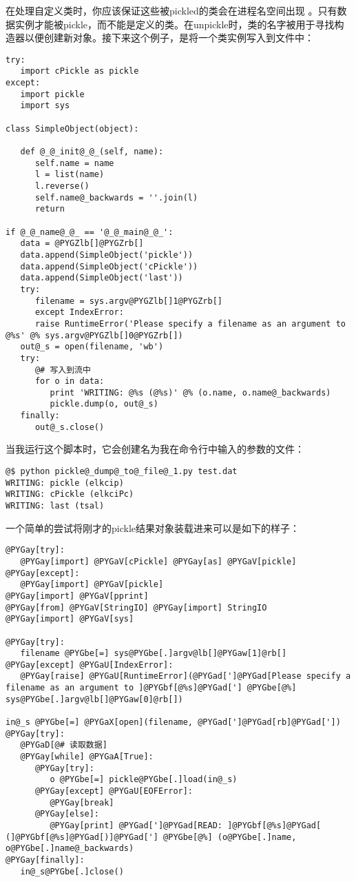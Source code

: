 \documentclass[a4paper,10pt,english]{manual}
\begin{document}
在处理自定义类时，你应该保证这些被pickled的类会在进程名空间出现 。只有数据实例才能被pickle，而不能是定义的类。在unpickle时，类的名字被用于寻找构造器以便创建新对象。接下来这个例子，是将一个类实例写入到文件中：

\begin{Verbatim}[commandchars=@\[\]]
try:
   import cPickle as pickle
except:
   import pickle
   import sys

class SimpleObject(object):

   def @_@_init@_@_(self, name):
      self.name = name
      l = list(name)
      l.reverse()
      self.name@_backwards = ''.join(l)
      return

if @_@_name@_@_ == '@_@_main@_@_':
   data = @PYGZlb[]@PYGZrb[]
   data.append(SimpleObject('pickle'))
   data.append(SimpleObject('cPickle'))
   data.append(SimpleObject('last'))
   try:
      filename = sys.argv@PYGZlb[]1@PYGZrb[]
      except IndexError:
      raise RuntimeError('Please specify a filename as an argument to @%s' @% sys.argv@PYGZlb[]0@PYGZrb[])
   out@_s = open(filename, 'wb')
   try:
      @# 写入到流中
      for o in data:
         print 'WRITING: @%s (@%s)' @% (o.name, o.name@_backwards)
         pickle.dump(o, out@_s)
   finally:
      out@_s.close()
\end{Verbatim}

当我运行这个脚本时，它会创建名为我在命令行中输入的参数的文件：

\begin{Verbatim}[commandchars=@\[\]]
@$ python pickle@_dump@_to@_file@_1.py test.dat
WRITING: pickle (elkcip)
WRITING: cPickle (elkciPc)
WRITING: last (tsal)
\end{Verbatim}

一个简单的尝试将刚才的pickle结果对象装载进来可以是如下的样子：

\begin{Verbatim}[commandchars=@\[\]]
@PYGay[try]:
   @PYGay[import] @PYGaV[cPickle] @PYGay[as] @PYGaV[pickle]
@PYGay[except]:
   @PYGay[import] @PYGaV[pickle]
@PYGay[import] @PYGaV[pprint]
@PYGay[from] @PYGaV[StringIO] @PYGay[import] StringIO
@PYGay[import] @PYGaV[sys]

@PYGay[try]:
   filename @PYGbe[=] sys@PYGbe[.]argv@lb[]@PYGaw[1]@rb[]
@PYGay[except] @PYGaU[IndexError]:
   @PYGay[raise] @PYGaU[RuntimeError](@PYGad[']@PYGad[Please specify a filename as an argument to ]@PYGbf[@%s]@PYGad['] @PYGbe[@%] sys@PYGbe[.]argv@lb[]@PYGaw[0]@rb[])

in@_s @PYGbe[=] @PYGaX[open](filename, @PYGad[']@PYGad[rb]@PYGad['])
@PYGay[try]:
   @PYGaD[@# 读取数据]
   @PYGay[while] @PYGaA[True]:
      @PYGay[try]:
         o @PYGbe[=] pickle@PYGbe[.]load(in@_s)
      @PYGay[except] @PYGaU[EOFError]:
         @PYGay[break]
      @PYGay[else]:
         @PYGay[print] @PYGad[']@PYGad[READ: ]@PYGbf[@%s]@PYGad[ (]@PYGbf[@%s]@PYGad[)]@PYGad['] @PYGbe[@%] (o@PYGbe[.]name, o@PYGbe[.]name@_backwards)
@PYGay[finally]:
   in@_s@PYGbe[.]close()
\end{Verbatim}
\end{document}
